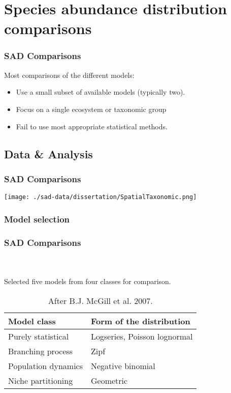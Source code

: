 \documentclass[14pt]{beamer}
\begin{document}
\section{Species abundance distribution comparisons}
\begin{frame}
\frametitle{SAD Comparisons}
\begin{large}
Most comparisons of the different models:
\end{large}
\begin{itemize}
\item Use a small subset of available models (typically two).
\item Focus on a single ecosystem or taxonomic group
\item Fail to use most appropriate statistical methods. 
\end{itemize}
\end{frame}

\subsection{Data & Analysis}
\begin{frame}
\frametitle{SAD Comparisons}
\begin{center}
\texttt{[image: ./sad-data/dissertation/SpatialTaxonomic.png]}
\end{center}
\end{frame}

\subsubsection{Model selection}
\begin{frame}[shrink=10]
\frametitle{SAD Comparisons}
~\\
~\\
Selected five models from four classes for comparison.
\begin{table}
\begin{tabular}{l|l}
 Model class & Form of the distribution\\ 
\hline
 Purely statistical & Logseries, Poisson lognormal\\
 Branching process & Zipf \\
 Population dynamics & Negative binomial\\
 Niche partitioning & Geometric \\
\end{tabular}
~\\
~\\
~\\
~\\
\caption{After B.J. McGill et al. 2007.}
\end{table}
\end{frame}
\end{document}
